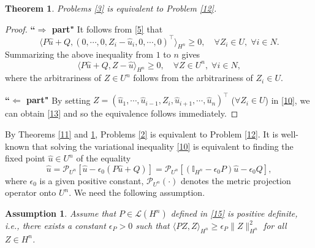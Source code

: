 \documentclass[10pt]{article}
\newtheorem{thm}{Theorem}[section]
\newtheorem{assumption}{Assumption}[section]
\begin{document}
\begin{thm}\label{59}
Problems  \ref{3} is equivalent to Problem \ref{12}.
\end{thm}
\begin{proof}
\textbf{``$\Rightarrow$ part"} It follows from \eqref{5} that
\begin{equation}\label{13}
\langle P\widehat{u}+Q,(0,\cdots,0,Z_i-\widehat{u}_i,0,\cdots,0)^{\top}\rangle_{H^n}\geq0, \quad \forall Z_i\in U, \;\forall i\in N.
\end{equation}
Summarizing the above inequality from $1$ to $n$ gives
$$
\langle P\widehat{u}+Q,Z-\widehat{u}\rangle_{H^n}\geq 0,\quad \forall Z\in U^{n}, \;\forall i\in N,
$$
where the arbitrariness of $Z\in U^{n}$ follows from the arbitrariness of $Z_i\in U$.

\textbf{``$\Leftarrow$ part"}
By setting
$Z=(\widehat{u}_1,\cdots,\widehat{u}_{i-1},Z_i,\widehat{u}_{i+1},\cdots,\widehat{u}_n)^{\top}$ ($\forall Z_i\in U$)
in \eqref{10}, we can obtain \eqref{13} and so the equivalence  follows immediately.
\end{proof}
By Theorems \ref{11} and \ref{59},  Problems  \ref{2} is equivalent to Problem \ref{12}. It is well-known that  solving the variational inequality \eqref{10} is equivalent to finding the fixed point $\widehat{u}\in U^n$ of the   equality
\begin{equation}\label{17}
\widehat{u}=\mathcal{P}_{U^n}[\widehat{u}-\epsilon_0(P\widehat{u}+Q)]=\mathcal{P}_{U^n}[(\mathbb{I}_{H^n}-\epsilon_0P)\widehat{u}-\epsilon_0Q],
\end{equation}
where $\epsilon_0$ is a given positive constant, $\mathcal{P}_{U^n}(\cdot)$ denotes the
metric projection operator onto $U^n$. We need the following assumption.
\begin{assumption}\label{16}
Assume that $P\in \mathcal{L}(H^n)$ defined in \eqref{15} is positive definite, i.e., there exists a constant $\epsilon_P>0$ such that
$\langle PZ,Z\rangle_{H^n}\geq \epsilon_{P}\|Z\|^2_{H^n}$ for all $Z\in H^{n}$.
\end{assumption}
\end{document}
